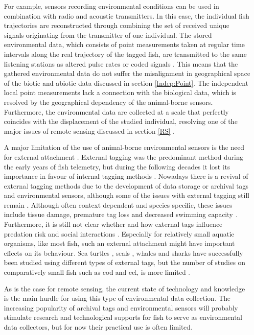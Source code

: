 \documentclass[12pt,authoryear]{elsarticle}
\begin{document}
For example, sensors recording environmental conditions can be used in combination with radio and acoustic transmitters. In this case, the individual fish trajectories are reconstructed through combining the set of received unique signals originating from the transmitter of one individual. The stored environmental data, which consists of point measurements taken at regular time intervals along the real trajectory of the tagged fish, are transmitted to the same listening stations as altered pulse rates or coded signals \citep{Thorstad2013}. This means that the gathered environmental data do not suffer the misalignment in geographical space of the biotic and abiotic data discussed in section \ref{Indep:Point}. The independent local point measurements lack a connection with the biological data, which is resolved by the geographical dependency of the animal-borne sensors. Furthermore, the environmental data are collected at a scale that perfectly coincides with the displacement of the studied individual, resolving one of the major issues of remote sensing discussed in section \ref{RS} \citep{Costa2012}. 

\vspace{5mm}

A major limitation of the use of animal-borne environmental sensors is the need for external attachment \citep{Hussey2015}. External tagging was the predominant method during the early years of fish telemetry, but during the following decades it lost its importance in favour of internal tagging methods \citep{Martyn2002}. Nowadays there is a revival of external tagging methods due to the development of data storage or archival tags and environmental sensors, although some of the issues with external tagging still remain \citep{Jepsen2015}. Although often context dependent and species specific, these issues include tissue damage, premature tag loss and decreased swimming capacity \citep{Jepsen2015}. Furthermore, it is still not clear whether and how external tags influence predation risk and social interactions \citep{Jepsen2015}. Especially for relatively small aquatic organisms, like most fish, such an external attachment might have important effects on its behaviour. Sea turtles \citep{Hays2006}, seals \citep{Roquet2013}, whales \citep{Lydersen2002} and sharks \citep{Stevens2010} have successfully been studied using different types of external tags, but the number of studies on comparatively small fish such as cod and eel, is more limited \citep{Hussey2015}. 

As is the case for remote sensing, the current state of technology and knowledge is the main hurdle for using this type of environmental data collection. The increasing popularity of archival tags and environmental sensors will probably stimulate research and technological supports for fish to serve as environmental data collectors, but for now their practical use is often limited.
\end{document}
